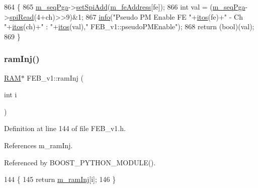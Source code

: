 \begin{DoxyCode}
864                                             \{
865   \hyperlink{classFEB__v1_a6c7804ac86796f233a8393043adf2e77}{m\_seqPga}->\hyperlink{classSeqPGA_ac998ce3a6d9b5f2e88cc8393f8c1df53}{setSpiAdd}(\hyperlink{classFEB__v1_a4e1945c2d5b434125f375e9d0fc6d99f}{m\_feAddress}[fe]);
866   \textcolor{keywordtype}{int} val = (\hyperlink{classFEB__v1_a6c7804ac86796f233a8393043adf2e77}{m\_seqPga}->\hyperlink{classSeqPGA_ab3d0e5e5d4014bc7a92588a76b8713d4}{spiRead}(4+ch)>>9)&1;
867   \hyperlink{classObject_a644fd329ea4cb85f54fa6846484b84a8}{info}(\textcolor{stringliteral}{"Pseudo PM Enable FE "}+\hyperlink{Tools_8h_af330027dbdafb9a30768b3613c553e60}{itos}(fe)+\textcolor{stringliteral}{" - Ch "}+\hyperlink{Tools_8h_af330027dbdafb9a30768b3613c553e60}{itos}(ch)+\textcolor{stringliteral}{" : "}+\hyperlink{Tools_8h_af330027dbdafb9a30768b3613c553e60}{itos}(val),\textcolor{stringliteral}{"
      FEB\_v1::pseudoPMEnable"});
868   \textcolor{keywordflow}{return} (\textcolor{keywordtype}{bool})(val);
869 \}
\end{DoxyCode}
\mbox{\label{classFEB__v1_aceff066f476794fefe2712e43bc2d6d2}} 
\subsubsection{\texorpdfstring{ram\+Inj()}{ramInj()}}
{\footnotesize\ttfamily \hyperlink{classRAM}{R\+AM}$\ast$ F\+E\+B\+\_\+v1\+::ram\+Inj (\begin{DoxyParamCaption}\item[{int}]{i }\end{DoxyParamCaption})\hspace{0.3cm}{\ttfamily [inline]}}



Definition at line 144 of file F\+E\+B\+\_\+v1.\+h.



References m\+\_\+ram\+Inj.



Referenced by B\+O\+O\+S\+T\+\_\+\+P\+Y\+T\+H\+O\+N\+\_\+\+M\+O\+D\+U\+L\+E().


\begin{DoxyCode}
144                      \{
145     \textcolor{keywordflow}{return} \hyperlink{classFEB__v1_a3a3d06225c94c88d4cc5da7a6bde3867}{m\_ramInj}[i];
146   \}
\end{DoxyCode}
\mbox{\label{classFEB__v1_ac59216f094007ede67d49bd23287be73}} 
